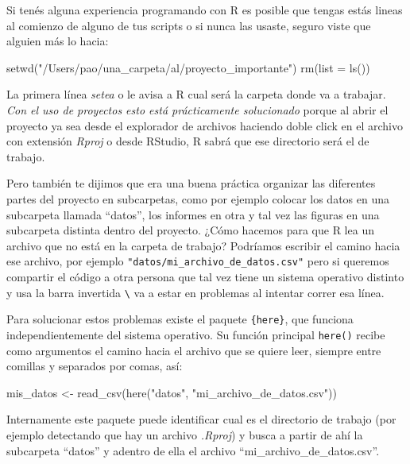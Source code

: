 \documentclass[
  openany]{book}
\newenvironment{Shaded}{\begin{snugshade}}{\end{snugshade}}
\newcommand{\AttributeTok}[1]{\textcolor[rgb]{0.77,0.63,0.00}{#1}}
\newcommand{\FunctionTok}[1]{\textcolor[rgb]{0.00,0.00,0.00}{#1}}
\newcommand{\NormalTok}[1]{#1}
\newcommand{\OtherTok}[1]{\textcolor[rgb]{0.56,0.35,0.01}{#1}}
\newcommand{\StringTok}[1]{\textcolor[rgb]{0.31,0.60,0.02}{#1}}
\begin{document}
Si tenés alguna experiencia programando con R es posible que tengas estás lineas al comienzo de alguno de tus scripts o si nunca las usaste, seguro viste que alguien más lo hacia:

\begin{Shaded}
\begin{Highlighting}[]
\FunctionTok{setwd}\NormalTok{(}\StringTok{"/Users/pao/una\_carpeta/al/proyecto\_importante"}\NormalTok{)}
\FunctionTok{rm}\NormalTok{(}\AttributeTok{list =} \FunctionTok{ls}\NormalTok{())}
\end{Highlighting}
\end{Shaded}

La primera línea \emph{setea} o le avisa a R cual será la carpeta donde va a trabajar. \emph{Con el uso de proyectos esto está prácticamente solucionado} porque al abrir el proyecto ya sea desde el explorador de archivos haciendo doble click en el archivo con extensión \emph{Rproj} o desde RStudio, R sabrá que ese directorio será el de trabajo.

Pero también te dijimos que era una buena práctica organizar las diferentes partes del proyecto en subcarpetas, como por ejemplo colocar los datos en una subcarpeta llamada ``datos'', los informes en otra y tal vez las figuras en una subcarpeta distinta dentro del proyecto. ¿Cómo hacemos para que R lea un archivo que no está en la carpeta de trabajo? Podríamos escribir el camino hacia ese archivo, por ejemplo \texttt{"datos/mi\_archivo\_de\_datos.csv"} pero si queremos compartir el código a otra persona que tal vez tiene un sistema operativo distinto y usa la barra invertida \texttt{\textbackslash{}} va a estar en problemas al intentar correr esa línea.

Para solucionar estos problemas existe el paquete \texttt{\{here\}}, que funciona independientemente del sistema operativo. Su función principal \texttt{here()} recibe como argumentos el camino hacia el archivo que se quiere leer, siempre entre comillas y separados por comas, así:

\begin{Shaded}
\begin{Highlighting}[]
\NormalTok{mis\_datos }\OtherTok{\textless{}{-}} \FunctionTok{read\_csv}\NormalTok{(}\FunctionTok{here}\NormalTok{(}\StringTok{"datos"}\NormalTok{, }\StringTok{"mi\_archivo\_de\_datos.csv"}\NormalTok{))}
\end{Highlighting}
\end{Shaded}

Internamente este paquete puede identificar cual es el directorio de trabajo (por ejemplo detectando que hay un archivo \emph{.Rproj}) y busca a partir de ahí la subcarpeta ``datos'' y adentro de ella el archivo ``mi\_archivo\_de\_datos.csv''.
\end{document}
